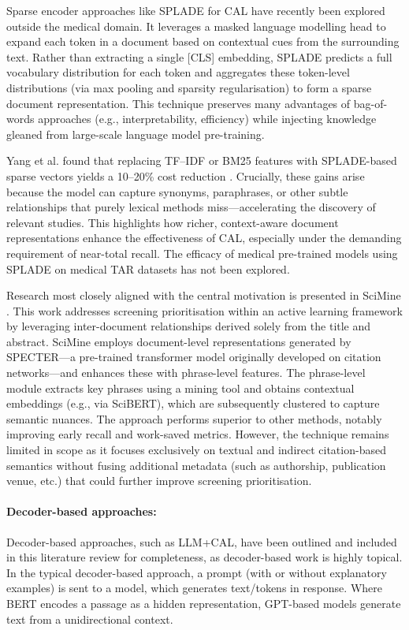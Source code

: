 \documentclass[10pt,oneside]{book}
\begin{document}
Sparse encoder approaches like SPLADE for CAL have recently been explored outside the medical domain. It leverages a masked language modelling head to expand each token in a document based on contextual cues from the surrounding text. Rather than extracting a single [CLS] embedding, SPLADE predicts a full vocabulary distribution for each token and aggregates these token-level distributions (via max pooling and sparsity regularisation) to form a sparse document representation. This technique preserves many advantages of bag-of-words approaches (e.g., interpretability, efficiency) while injecting knowledge gleaned from large-scale language model pre-training.

Yang et al. found that replacing TF–IDF or BM25 features with SPLADE-based sparse vectors yields a 10–20\% cost reduction \cite{yang_contextualization_2024}. Crucially, these gains arise because the model can capture synonyms, paraphrases, or other subtle relationships that purely lexical methods miss—accelerating the discovery of relevant studies. This highlights how richer, context-aware document representations enhance the effectiveness of CAL, especially under the demanding requirement of near-total recall. The efficacy of medical pre-trained models using SPLADE on medical TAR datasets has not been explored.

Research most closely aligned with the central motivation is presented in SciMine \cite{guo_scimine_2023}. This work addresses screening prioritisation within an active learning framework by leveraging inter-document relationships derived solely from the title and abstract. SciMine employs document-level representations generated by SPECTER—a pre-trained transformer model originally developed on citation networks—and enhances these with phrase-level features. The phrase-level module extracts key phrases using a mining tool and obtains contextual embeddings (e.g., via SciBERT), which are subsequently clustered to capture semantic nuances. The approach performs superior to other methods, notably improving early recall and work-saved metrics. However, the technique remains limited in scope as it focuses exclusively on textual and indirect citation-based semantics without fusing additional metadata (such as authorship, publication venue, etc.) that could further improve screening prioritisation.


\paragraph{Decoder-based approaches: }
Decoder-based approaches, such as LLM+CAL, have been outlined and included in this literature review for completeness, as decoder-based work is highly topical. In the typical decoder-based approach, a prompt (with or without explanatory examples) is sent to a model, which generates text/tokens in response. Where BERT encodes a passage as a hidden representation, GPT-based models generate text from a unidirectional context.
\end{document}
